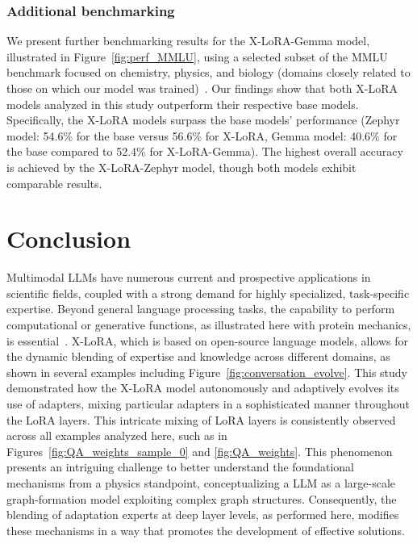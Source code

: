 \subsubsection{Additional benchmarking} We present further benchmarking results for the X-LoRA-Gemma model, illustrated in Figure~\ref{fig:perf_MMLU}, using a selected subset of the MMLU benchmark focused on chemistry, physics, and biology (domains closely related to those on which our model was trained)~\cite{Hendrycks2020MeasuringUnderstanding}. Our findings show that both X-LoRA models analyzed in this study outperform their respective base models. Specifically, the X-LoRA models surpass the base models’ performance (Zephyr model: 54.6\% for the base versus 56.6\% for X-LoRA, Gemma model: 40.6\% for the base compared to 52.4\% for X-LoRA-Gemma). The highest overall accuracy is achieved by the X-LoRA-Zephyr model, though both models exhibit comparable results.

\section{Conclusion}

Multimodal LLMs have numerous current and prospective applications in scientific fields, coupled with a strong demand for highly specialized, task-specific expertise. Beyond general language processing tasks, the capability to perform computational or generative functions, as illustrated here with protein mechanics, is essential~\cite{Luu2023BioinspiredLLM:Materials,Buehler2023MechGPTModalities,Buehler2023MeLMProblemsb}. X-LoRA, which is based on open-source language models, allows for the dynamic blending of expertise and knowledge across different domains, as shown in several examples including Figure~\ref{fig:conversation_evolve}. This study demonstrated how the X-LoRA model autonomously and adaptively evolves its use of adapters, mixing particular adapters in a sophisticated manner throughout the LoRA layers. This intricate mixing of LoRA layers is consistently observed across all examples analyzed here, such as in Figures~\ref{fig:QA_weights_sample_0} and \ref{fig:QA_weights}. This phenomenon presents an intriguing challenge to better understand the foundational mechanisms from a physics standpoint, conceptualizing a LLM as a large-scale graph-formation model exploiting complex graph structures. Consequently, the blending of adaptation experts at deep layer levels, as performed here, modifies these mechanisms in a way that promotes the development of effective solutions.

